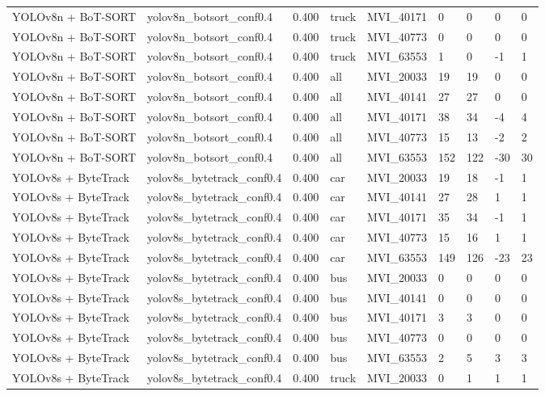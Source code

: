 \begin{tabular}{lllllllll}
YOLOv8n + BoT-SORT & yolov8n\_botsort\_conf0.4 & 0.400 & truck & MVI\_40171 & 0 & 0 & 0 & 0 \\
YOLOv8n + BoT-SORT & yolov8n\_botsort\_conf0.4 & 0.400 & truck & MVI\_40773 & 0 & 0 & 0 & 0 \\
YOLOv8n + BoT-SORT & yolov8n\_botsort\_conf0.4 & 0.400 & truck & MVI\_63553 & 1 & 0 & -1 & 1 \\
YOLOv8n + BoT-SORT & yolov8n\_botsort\_conf0.4 & 0.400 & all & MVI\_20033 & 19 & 19 & 0 & 0 \\
YOLOv8n + BoT-SORT & yolov8n\_botsort\_conf0.4 & 0.400 & all & MVI\_40141 & 27 & 27 & 0 & 0 \\
YOLOv8n + BoT-SORT & yolov8n\_botsort\_conf0.4 & 0.400 & all & MVI\_40171 & 38 & 34 & -4 & 4 \\
YOLOv8n + BoT-SORT & yolov8n\_botsort\_conf0.4 & 0.400 & all & MVI\_40773 & 15 & 13 & -2 & 2 \\
YOLOv8n + BoT-SORT & yolov8n\_botsort\_conf0.4 & 0.400 & all & MVI\_63553 & 152 & 122 & -30 & 30 \\
YOLOv8s + ByteTrack & yolov8s\_bytetrack\_conf0.4 & 0.400 & car & MVI\_20033 & 19 & 18 & -1 & 1 \\
YOLOv8s + ByteTrack & yolov8s\_bytetrack\_conf0.4 & 0.400 & car & MVI\_40141 & 27 & 28 & 1 & 1 \\
YOLOv8s + ByteTrack & yolov8s\_bytetrack\_conf0.4 & 0.400 & car & MVI\_40171 & 35 & 34 & -1 & 1 \\
YOLOv8s + ByteTrack & yolov8s\_bytetrack\_conf0.4 & 0.400 & car & MVI\_40773 & 15 & 16 & 1 & 1 \\
YOLOv8s + ByteTrack & yolov8s\_bytetrack\_conf0.4 & 0.400 & car & MVI\_63553 & 149 & 126 & -23 & 23 \\
YOLOv8s + ByteTrack & yolov8s\_bytetrack\_conf0.4 & 0.400 & bus & MVI\_20033 & 0 & 0 & 0 & 0 \\
YOLOv8s + ByteTrack & yolov8s\_bytetrack\_conf0.4 & 0.400 & bus & MVI\_40141 & 0 & 0 & 0 & 0 \\
YOLOv8s + ByteTrack & yolov8s\_bytetrack\_conf0.4 & 0.400 & bus & MVI\_40171 & 3 & 3 & 0 & 0 \\
YOLOv8s + ByteTrack & yolov8s\_bytetrack\_conf0.4 & 0.400 & bus & MVI\_40773 & 0 & 0 & 0 & 0 \\
YOLOv8s + ByteTrack & yolov8s\_bytetrack\_conf0.4 & 0.400 & bus & MVI\_63553 & 2 & 5 & 3 & 3 \\
YOLOv8s + ByteTrack & yolov8s\_bytetrack\_conf0.4 & 0.400 & truck & MVI\_20033 & 0 & 1 & 1 & 1 \\

\end{tabular}

